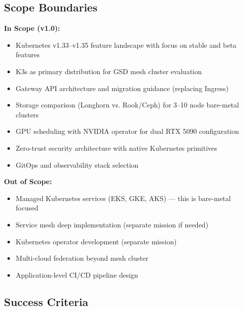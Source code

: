 \documentclass[11pt,letterpaper]{article}
\begin{document}
\subsection{Scope Boundaries}

\textbf{In Scope (v1.0):}
\begin{itemize}[leftmargin=2em]
\item Kubernetes v1.33--v1.35 feature landscape with focus on stable and beta features
\item K3s as primary distribution for GSD mesh cluster evaluation
\item Gateway API architecture and migration guidance (replacing Ingress)
\item Storage comparison (Longhorn vs. Rook/Ceph) for 3--10 node bare-metal clusters
\item GPU scheduling with NVIDIA operator for dual RTX 5090 configuration
\item Zero-trust security architecture with native Kubernetes primitives
\item GitOps and observability stack selection
\end{itemize}

\textbf{Out of Scope:}
\begin{itemize}[leftmargin=2em]
\item Managed Kubernetes services (EKS, GKE, AKS) --- this is bare-metal focused
\item Service mesh deep implementation (separate mission if needed)
\item Kubernetes operator development (separate mission)
\item Multi-cloud federation beyond mesh cluster
\item Application-level CI/CD pipeline design
\end{itemize}

\subsection{Success Criteria}
\end{document}
